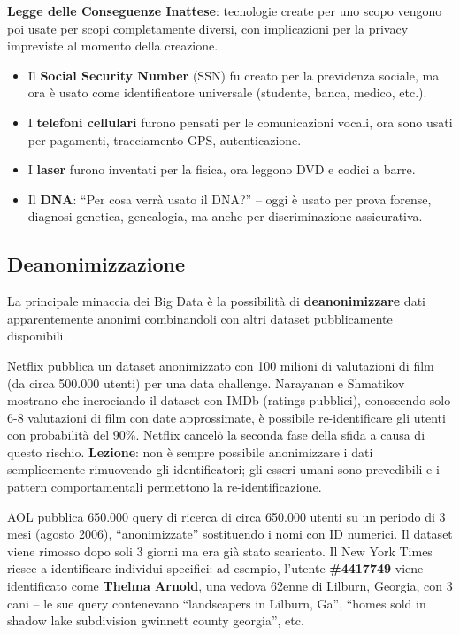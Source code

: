 \documentclass[a4paper,11pt]{article}
\begin{document}
\textbf{Legge delle Conseguenze Inattese}: tecnologie create per uno scopo vengono poi usate per scopi completamente diversi, con implicazioni per la privacy impreviste al momento della creazione.
\begin{itemize}
  \item Il \textbf{Social Security Number} (SSN) fu creato per la previdenza sociale, ma ora \`{e} usato come identificatore universale (studente, banca, medico, etc.).
  \item I \textbf{telefoni cellulari} furono pensati per le comunicazioni vocali, ora sono usati per pagamenti, tracciamento GPS, autenticazione.
  \item I \textbf{laser} furono inventati per la fisica, ora leggono DVD e codici a barre.
  \item Il \textbf{DNA}: ``Per cosa verr\`{a} usato il DNA?'' -- oggi \`{e} usato per prova forense, diagnosi genetica, genealogia, ma anche per discriminazione assicurativa.
\end{itemize}

\subsection{Deanonimizzazione}

La principale minaccia dei Big Data \`{e} la possibilit\`{a} di \textbf{deanonimizzare} dati apparentemente anonimi combinandoli con altri dataset pubblicamente disponibili.

\begin{esempio}
Netflix pubblica un dataset anonimizzato con 100 milioni di valutazioni di film (da circa 500.000 utenti) per una data challenge. Narayanan e Shmatikov mostrano che incrociando il dataset con IMDb (ratings pubblici), conoscendo solo 6-8 valutazioni di film con date approssimate, \`{e} possibile re-identificare gli utenti con probabilit\`{a} del 90\%. Netflix cancel\`{o} la seconda fase della sfida a causa di questo rischio. \textbf{Lezione}: non \`{e} sempre possibile anonimizzare i dati semplicemente rimuovendo gli identificatori; gli esseri umani sono prevedibili e i pattern comportamentali permettono la re-identificazione.
\end{esempio}

\begin{esempio}
AOL pubblica 650.000 query di ricerca di circa 650.000 utenti su un periodo di 3 mesi (agosto 2006), ``anonimizzate'' sostituendo i nomi con ID numerici. Il dataset viene rimosso dopo soli 3 giorni ma era gi\`{a} stato scaricato. Il New York Times riesce a identificare individui specifici: ad esempio, l'utente \textbf{\#4417749} viene identificato come \textbf{Thelma Arnold}, una vedova 62enne di Lilburn, Georgia, con 3 cani -- le sue query contenevano ``landscapers in Lilburn, Ga'', ``homes sold in shadow lake subdivision gwinnett county georgia'', etc.
\end{esempio}
\end{document}
